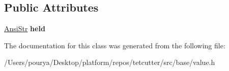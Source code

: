 \subsection*{Public Attributes}
\begin{DoxyCompactItemize}
\item 
\hypertarget{classps_1_1PRIVATE_1_1holder_3_01AnsiStr_01_4_aa62f904f20189ed4f82c5ed4481272b3}{}\hyperlink{classps_1_1base_1_1CAString}{Ansi\+Str} {\bfseries held}\label{classps_1_1PRIVATE_1_1holder_3_01AnsiStr_01_4_aa62f904f20189ed4f82c5ed4481272b3}

\end{DoxyCompactItemize}


The documentation for this class was generated from the following file\+:\begin{DoxyCompactItemize}
\item 
/\+Users/pourya/\+Desktop/platform/repos/tetcutter/src/base/value.\+h\end{DoxyCompactItemize}
